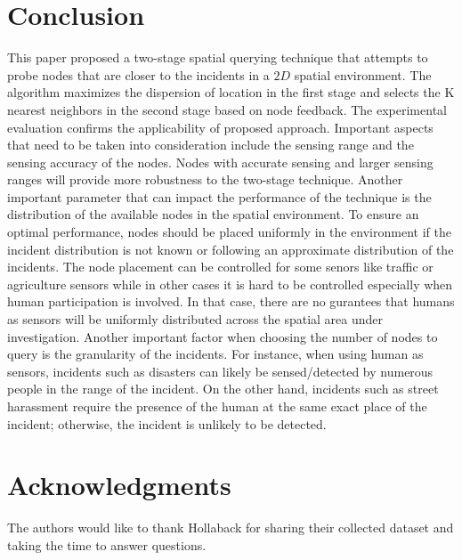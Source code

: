 \documentclass{acm_proc_article-sp}
\begin{document}
\section{Conclusion}
This paper proposed a two-stage spatial querying technique that attempts to probe nodes that are closer to the incidents in a $2D$ spatial environment. The algorithm maximizes the dispersion of location in the first stage and selects the K nearest neighbors in the second stage based on node feedback. The experimental evaluation confirms the applicability of proposed approach.
Important aspects that need to be taken into consideration include the sensing range and the sensing accuracy of the nodes. Nodes with accurate sensing and larger sensing ranges will provide more robustness to the two-stage technique. Another important parameter that can impact the performance of the technique is the distribution of the available nodes in the spatial environment. To ensure an optimal performance, nodes should be placed uniformly in the environment if the incident distribution is not known or following an approximate distribution of the incidents. The node placement can be controlled for some senors like traffic or agriculture sensors while in other cases it is hard to be controlled especially when human participation is involved. In that case, there are no gurantees that humans as sensors will be uniformly distributed across the spatial area under investigation. Another important factor when choosing the number of nodes to query is the granularity of the incidents. For instance, when using human as sensors, incidents such as disasters can likely be sensed/detected by numerous people in the range of the incident. On the other hand, incidents such as street harassment require the presence of the human at the same exact place of the incident; otherwise, the incident is unlikely to be detected.

\section{Acknowledgments}
The authors would like to thank Hollaback for sharing their collected dataset and taking the time to answer questions.

{\footnotesize
}  %
%
%
\end{document}
